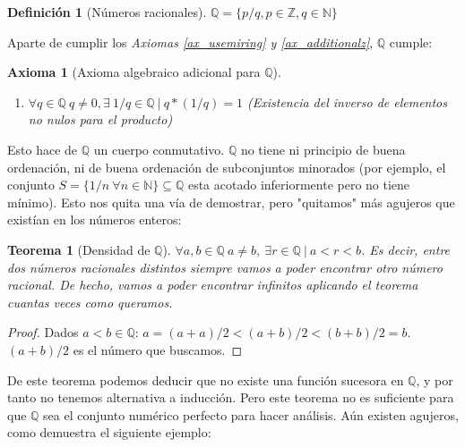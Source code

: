 \documentclass{article}
\newtheorem{theorem}{Teorema}
\newtheorem{axiom}{Axioma}
\newtheorem{define}{Definición}
\begin{document}
\begin{define}[Números racionales]
$\mathbb{Q} = \{ p/{q},p\in \mathbb{Z},q\in \mathbb{N}\}$
\end{define}

Aparte de cumplir los \textit{Axiomas \ref{ax_usemiring} y \ref{ax_additionalz}}, $\mathbb{Q}$ cumple:

\begin{axiom}[Axioma algebraico adicional para $\mathbb{Q}$]\ %
\begin{enumerate}
	\item
	$\forall q \in \mathbb{Q}\ q \neq 0, \exists\ 1/q \in \mathbb{Q}\ |\ q * (1/q) = 1$ (Existencia del inverso de elementos no nulos para el producto)
\end{enumerate}
\end{axiom}

Esto hace de $\mathbb{Q}$ un cuerpo conmutativo. $\mathbb{Q}$ no tiene ni principio de buena ordenación, ni de buena ordenación de subconjuntos minorados (por ejemplo, el conjunto $S=\{ 1/n\ \forall n \in \mathbb{N}\}\subseteq \mathbb{Q}$ esta acotado inferiormente pero no tiene mínimo). Esto nos quita una vía de demostrar, pero "quitamos" más agujeros que existían en los números enteros:

\begin{theorem}[Densidad de $\mathbb{Q}$]
$\forall a,b \in \mathbb{Q}\ a \neq b,\ \exists r \in \mathbb{Q}\ |\ a<r<b$. Es decir, entre dos números racionales distintos siempre vamos a poder encontrar otro número racional. De hecho, vamos a poder encontrar infinitos aplicando el teorema cuantas veces como queramos.
\end{theorem}
\begin{proof}
Dados $a<b \in \mathbb{Q}$: $a = (a+a)/2 < (a+b)/2 < (b+b)/2 = b$. $(a+b)/2$ es el número que buscamos. 
\end{proof}
De este teorema podemos deducir que no existe una función sucesora en $\mathbb{Q}$, y por tanto no tenemos alternativa a inducción. Pero este teorema no es suficiente para que $\mathbb{Q}$ sea el conjunto numérico perfecto para hacer análisis. Aún existen agujeros, como demuestra el siguiente ejemplo:
\end{document}

